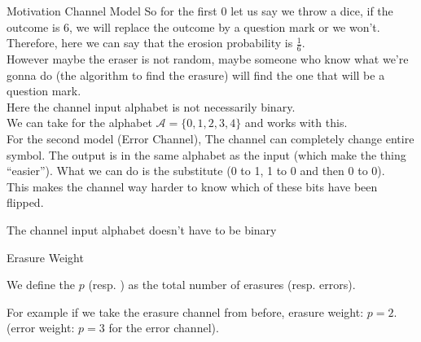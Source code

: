 \begin{parag}{Motivation Channel Model}
    So for the first $0$ let us say we throw a dice, if the outcome is $6$, we will replace the outcome by a question mark or we won't. Therefore, here we can say that the erosion probability is $\frac{1}{6}$.\\
    However maybe the eraser is not random, maybe someone who know what we're gonna do (the algorithm to find the erasure) will find the one that will be a question mark.\\
Here the channel input alphabet is not necessarily binary.\\
We can take for the alphabet $\mathcal{A} = \{0, 1, 2, 3, 4\}$ and works with this.\\
For the second model (Error Channel), The channel can completely change entire symbol. The output is in the same alphabet as the input (which make the thing ``easier''). What we can do is the substitute (0 to 1, 1 to 0 and then 0 to 0).\\
This makes the channel way harder to know which of these bits have been flipped.
\begin{framedremark}
    The channel input alphabet doesn't have to be binary
\end{framedremark}

\end{parag}
\begin{parag}{Erasure Weight}
    \begin{definition}
    We define the  $p$ (resp. ) as the total number of erasures (resp. errors).
    \end{definition}
    
    For example if we take the erasure channel from before, erasure weight: $p= 2$. (error weight: $p = 3$ for the error channel).
\end{parag}
